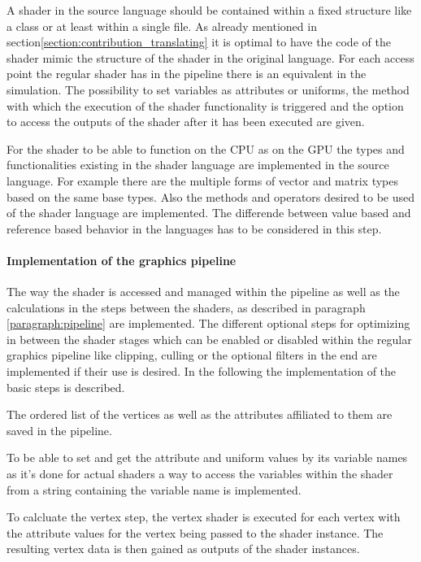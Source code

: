A shader in the source language should be contained within a fixed structure like a class or at least within a single file.
As already mentioned in section\ref{section:contribution_translating} it is optimal to have the code of the shader mimic the structure of the shader in the original language. For each access point the regular shader has in the pipeline there is an equivalent in the simulation. The possibility to set variables as attributes or uniforms, the method with which the execution of the shader functionality is triggered and the option to access the outputs of the shader after it has been executed are given.

For the shader to be able to function on the CPU as on the GPU the types and functionalities existing in the shader language are implemented in the source language. For example there are the multiple forms of vector and matrix types based on the same base types. Also the methods and operators desired to be used of the shader language are implemented. The differende between value based and reference based behavior in the languages has to be considered in this step.

\paragraph{Implementation of the graphics pipeline}

The way the shader is accessed and managed within the pipeline  as well as the calculations in the steps between the shaders, as described in paragraph \ref{paragraph:pipeline} are implemented. The different optional steps for optimizing in between the shader stages which can be enabled or disabled within the regular graphics pipeline like clipping, culling or the optional filters in the end are implemented if their use is desired. In the following the implementation of the basic steps is described.

The ordered list of the vertices as well as the attributes affiliated to them are saved in the pipeline.

To be able to set and get the attribute and uniform values by its variable names as it's done for actual shaders  a way to access the variables within the shader from a string containing the variable name is implemented.

To calcluate the vertex step, the vertex shader is executed for each vertex with the attribute values for the vertex being passed to the shader instance. The resulting vertex data is then gained as outputs of the shader instances.

